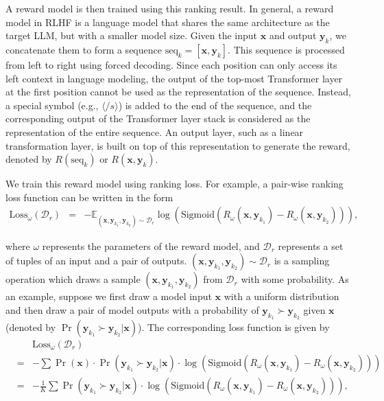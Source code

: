 A reward model is then trained using this ranking result. In general, a reward model in RLHF is a language model that shares the same architecture as the target LLM, but with a smaller model size. Given the input $\mathbf{x}$ and output $\mathbf{y}_k$, we concatenate them to form a sequence $\mathrm{seq}_k = [\mathbf{x},\mathbf{y}_k]$. This sequence is processed from left to right using forced decoding. Since each position can only access its left context in language modeling, the output of the top-most Transformer layer at the first position cannot be used as the representation of the sequence. Instead, a special symbol (e.g., $\langle /s \rangle$) is added to the end of the sequence, and the corresponding output of the Transformer layer stack is considered as the representation of the entire sequence. An output layer, such as a linear transformation layer, is built on top of this representation to generate the reward, denoted by $R(\mathrm{seq}_k)$ or $R(\mathbf{x},\mathbf{y}_k)$.

We train this reward model using ranking loss. For example, a pair-wise ranking loss function can be written in the form
\begin{eqnarray}
\mathrm{Loss}_{\omega}(\mathcal{D}_r) & = & -\mathbb{E}_{(\mathbf{x},\mathbf{y}_{k_1},\mathbf{y}_{k_2}) \sim \mathcal{D}_r} \log(\mathrm{Sigmoid}(R_{\omega}(\mathbf{x},\mathbf{y}_{k_1}) - R_{\omega}(\mathbf{x},\mathbf{y}_{k_2}))),
\end{eqnarray}

\noindent where $\omega$ represents the parameters of the reward model, and $\mathcal{D}_r$ represents a set of tuples of an input and a pair of outputs. $(\mathbf{x},\mathbf{y}_{k_1},\mathbf{y}_{k_2}) \sim \mathcal{D}_r$ is a sampling operation which draws a sample $(\mathbf{x},\mathbf{y}_{k_1},\mathbf{y}_{k_2})$ from $\mathcal{D}_r$ with some probability. As an example, suppose we first draw a model input $\mathbf{x}$ with a uniform distribution and then draw a pair of model outputs with a probability of $\mathbf{y}_{k_1} \succ \mathbf{y}_{k_2}$ given $\mathbf{x}$ (denoted by $\Pr(\mathbf{y}_{k_1} \succ \mathbf{y}_{k_2} | \mathbf{x})$). The corresponding loss function is given by
\begin{eqnarray}
&   & \mathrm{Loss}_{\omega}(\mathcal{D}_r) \nonumber \\
& = & -\sum \Pr(\mathbf{x}) \cdot \Pr(\mathbf{y}_{k_1} \succ \mathbf{y}_{k_2} | \mathbf{x}) \cdot \log(\mathrm{Sigmoid}(R_{\omega}(\mathbf{x},\mathbf{y}_{k_1}) - R_{\omega}(\mathbf{x},\mathbf{y}_{k_2}))) \nonumber \\
& = & -\frac{1}{K} \sum \Pr(\mathbf{y}_{k_1} \succ \mathbf{y}_{k_2} | \mathbf{x}) \cdot \log(\mathrm{Sigmoid}(R_{\omega}(\mathbf{x},\mathbf{y}_{k_1}) - R_{\omega}(\mathbf{x},\mathbf{y}_{k_2}))),
\end{eqnarray}


